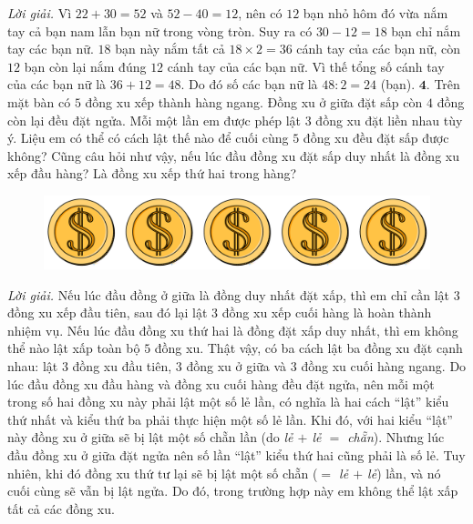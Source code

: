\begin{multicols}{2}
\begin{figure}[H]
		\vspace*{-5pt}
	\end{figure}
	\textit{Lời giải.} 	Vì $22+30=52$ và $52-40 = 12$, nên có $12$ bạn nhỏ hôm đó vừa nắm tay cả bạn nam lẫn bạn nữ trong vòng tròn. Suy ra có $30-12=18$ bạn chỉ nắm tay các bạn nữ.  $18$ bạn này nắm tất cả $18\times2=36$ cánh tay của các bạn nữ, còn $12$ bạn còn lại nắm đúng $12$ cánh tay của các bạn nữ. Vì thế tổng số cánh tay của các bạn nữ là $36+12=48$. Do đó số các bạn nữ là $48:2=24$ (bạn).
	\vskip 0.1cm
	$\pmb{4.}$ Trên mặt bàn có $5$ đồng xu xếp thành hàng ngang. Đồng xu ở giữa đặt sấp còn $4$ đồng còn lại đều đặt ngửa. Mỗi một lần em được phép lật $3$ đồng xu đặt liền nhau tùy ý. Liệu em có thể có cách lật thế nào để cuối cùng $5$ đồng xu đều đặt sấp được không?
	\vskip 0.1cm
	Cũng câu hỏi như vậy, nếu lúc đầu đồng xu đặt sấp duy nhất là đồng xu xếp đầu hàng? Là đồng xu xếp thứ hai trong hàng?
	\begin{figure}[H]
		\centering
		\vspace*{-5pt}
		\captionsetup{labelformat= empty, justification=centering}
		\includegraphics[width=1\linewidth]{Pi12_Bai4}
		\vspace*{-20pt}
	\end{figure}
	\textit{Lời giải.} Nếu lúc đầu đồng ở giữa là đồng duy nhất đặt xấp, thì em chỉ cần lật $3$ đồng xu xếp đầu tiên, sau đó lại lật $3$ đồng xu xếp cuối hàng là hoàn thành nhiệm vụ.
	\vskip 0.1cm
	Nếu lúc đầu đồng xu thứ hai là đồng đặt xấp duy nhất, thì em không thể nào lật xấp toàn bộ $5$ đồng xu. Thật vậy, có ba cách lật ba đồng xu đặt cạnh nhau: lật $3$ đồng xu đầu tiên, $3$ đồng xu ở giữa và $3$ đồng xu cuối hàng ngang. Do lúc đầu đồng xu đầu hàng và đồng xu cuối hàng đều đặt ngửa, nên mỗi một trong số hai đồng xu này phải lật một số lẻ lần, có nghĩa là hai cách “lật” kiểu thứ nhất và kiểu thứ ba phải thực hiện một số lẻ lần. Khi đó, với hai kiểu “lật” này đồng xu ở giữa sẽ bị lật một số chẵn lần (do \textit{lẻ $+$ lẻ $=$ chẵn}). Nhưng lúc đầu đồng xu ở giữa đặt ngửa nên số lần “lật” kiểu thứ hai cũng phải là số lẻ. Tuy nhiên, khi đó đồng xu thứ tư lại sẽ bị lật một số chẵn (\textit{$=$ lẻ $+$ lẻ}) lần, và nó cuối cùng sẽ vẫn bị lật ngửa. Do đó, trong trường hợp này em không thể lật xấp tất cả các đồng xu.
	\vskip 0.1cm

\end{multicols}
